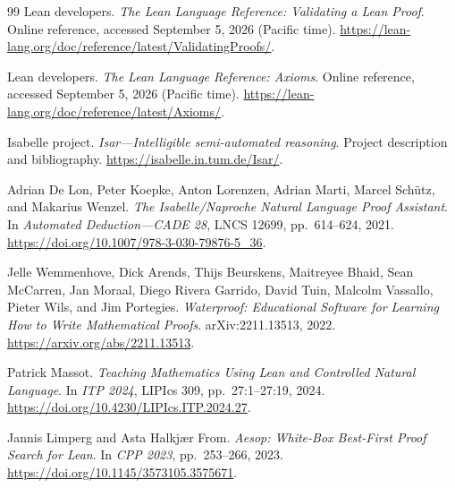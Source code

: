 \documentclass[11pt,a4paper]{article}
\theoremstyle{remark}
\begin{document}
\begin{thebibliography}{99}
Lean developers.
\emph{The Lean Language Reference: Validating a Lean Proof}.
Online reference, accessed September 5, 2026 (Pacific time).
\url{https://lean-lang.org/doc/reference/latest/ValidatingProofs/}.

Lean developers.
\emph{The Lean Language Reference: Axioms}.
Online reference, accessed September 5, 2026 (Pacific time).
\url{https://lean-lang.org/doc/reference/latest/Axioms/}.

Isabelle project.
\emph{Isar---Intelligible semi-automated reasoning}.
Project description and bibliography.
\url{https://isabelle.in.tum.de/Isar/}.

Adrian De Lon, Peter Koepke, Anton Lorenzen, Adrian Marti, Marcel Sch\"utz, and Makarius Wenzel.
\emph{The Isabelle/Naproche Natural Language Proof Assistant}.
In \emph{Automated Deduction---CADE 28}, LNCS 12699, pp.~614--624, 2021.
\url{https://doi.org/10.1007/978-3-030-79876-5_36}.

Jelle Wemmenhove, Dick Arends, Thijs Beurskens, Maitreyee Bhaid, Sean McCarren, Jan Moraal, Diego Rivera Garrido, David Tuin, Malcolm Vassallo, Pieter Wils, and Jim Portegies.
\emph{Waterproof: Educational Software for Learning How to Write Mathematical Proofs}.
arXiv:2211.13513, 2022.
\url{https://arxiv.org/abs/2211.13513}.

Patrick Massot.
\emph{Teaching Mathematics Using Lean and Controlled Natural Language}.
In \emph{ITP 2024}, LIPIcs 309, pp.~27:1--27:19, 2024.
\url{https://doi.org/10.4230/LIPIcs.ITP.2024.27}.

Jannis Limperg and Asta Halkj\ae r From.
\emph{Aesop: White-Box Best-First Proof Search for Lean}.
In \emph{CPP 2023}, pp.~253--266, 2023.
\url{https://doi.org/10.1145/3573105.3575671}.
\end{thebibliography}
\end{document}
